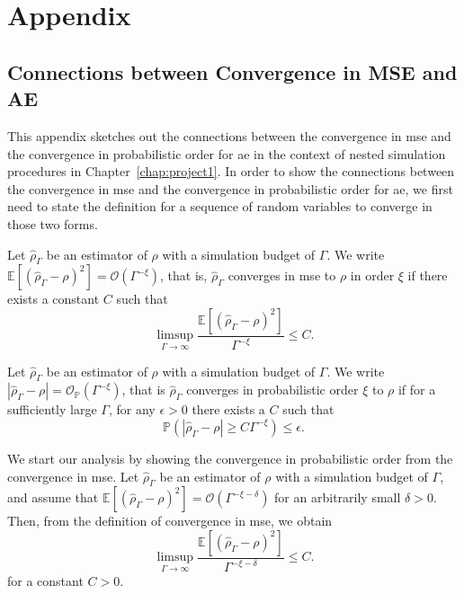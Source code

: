 \chapter*{Appendix} \label{chap:appendix}

\section*{Connections between Convergence in MSE and AE}

This appendix sketches out the connections between the convergence in \gls{mse} and the convergence in probabilistic order for \gls{ae} in the context of nested simulation procedures in Chapter~\ref{chap:project1}.
In order to show the connections between the convergence in \gls{mse} and the convergence in probabilistic order for \gls{ae}, we first need to state the definition for a sequence of random variables to converge in those two forms.

\begin{definitionA1*}
    Let $\hat{\rho}_{\Gamma}$ be an estimator of $\rho$ with a simulation budget of $\Gamma$. 
    We write $\mathbb{E} \left[ \left(\hat{\rho}_{\Gamma} - \rho\right)^2 \right] = \mathcal{O} \left( \Gamma^{-\xi} \right)$, that is, $\hat{\rho}_{\Gamma}$ converges in \gls{mse} to $\rho$ in order $\xi$ if there exists a constant $C$ such that
    $$
        \limsup_{\Gamma \to \infty} \frac{\mathbb{E} \left[\left(\hat{\rho}_{\Gamma} - \rho\right)^2 \right]}{\Gamma^{-\xi}} \leq C.
    $$
\end{definitionA1*}

\begin{definitionA2*}
    Let $\hat{\rho}_{\Gamma}$ be an estimator of $\rho$ with a simulation budget of $\Gamma$. 
    We write $|\hat{\rho}_{\Gamma} - \rho| = \mathcal{O}_{\mathbb{P}}(\Gamma^{-\xi})$, that is $\hat{\rho}_{\Gamma}$ converges in probabilistic order $\xi$ to $\rho$ if for a sufficiently large $\Gamma$, for any $\epsilon > 0$ there exists a $C$ such that
    $$
         \mathbb{P} \left( \left| \hat{\rho}_{\Gamma} - \rho \right| \geq C \Gamma^{-\xi} \right) \leq \epsilon.
    $$
\end{definitionA2*}

We start our analysis by showing the convergence in probabilistic order from the convergence in \gls{mse}.
Let $\hat{\rho}_{\Gamma}$ be an estimator of $\rho$ with a simulation budget of $\Gamma$, and assume that $\mathbb{E} \left[ \left(\hat{\rho}_{\Gamma} - \rho\right)^2 \right] = \mathcal{O} \left( \Gamma^{-\xi-\delta} \right)$ for an arbitrarily small $\delta > 0$.
Then, from the definition of convergence in \gls{mse}, we obtain
$$
    \limsup_{\Gamma \to \infty} \frac{\mathbb{E} \left[ \left(\hat{\rho}_{\Gamma} - \rho\right)^2 \right]}{\Gamma^{-\xi-\delta}} \leq C.
$$
for a constant $C > 0$.


